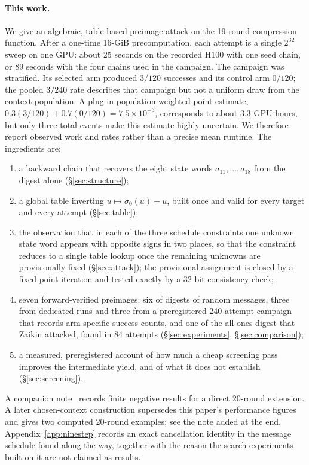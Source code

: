 \documentclass[11pt,a4paper]{article}
\begin{document}
\paragraph{This work.}
We give an algebraic, table-based preimage attack on the 19-round
compression function.  After a one-time 16-GiB precomputation, each attempt
is a single $2^{32}$ sweep on one GPU: about 25 seconds on the recorded H100
with one seed chain, or 89 seconds with the four chains used in the campaign.
The campaign was stratified.  Its selected arm produced $3/120$ successes and
its control arm $0/120$; the pooled $3/240$ rate describes that campaign but
not a uniform draw from the context population.  A plug-in
population-weighted point estimate,
$0.3(3/120)+0.7(0/120)=7.5\times10^{-3}$, corresponds to about 3.3 GPU-hours,
but only three total events make this estimate highly uncertain.  We therefore
report observed work and rates rather than a precise mean runtime.  The
ingredients are:
\begin{enumerate}
  \item a backward chain that recovers the eight state words
    $a_{11},\ldots,a_{18}$ from the digest alone (\S\ref{sec:structure});
  \item a global table inverting $u\mapsto\sigma_0(u)-u$, built once and
    valid for every target and every attempt (\S\ref{sec:table});
  \item the observation that in each of the three schedule constraints one
    unknown state word appears with opposite signs in two places, so that
    the constraint reduces to a single table lookup once the remaining
    unknowns are provisionally fixed (\S\ref{sec:attack}); the provisional
    assignment is closed by a fixed-point iteration and tested exactly by a
    32-bit consistency check;
  \item seven forward-verified preimages: six of digests of random
    messages, three from dedicated runs and three from a preregistered
    240-attempt campaign that records arm-specific success counts, and
    one of the all-ones digest that Zaikin attacked, found in 84 attempts
    (\S\ref{sec:experiments}, \S\ref{sec:comparison});
  \item a measured, preregistered account of how much a cheap screening
    pass improves the intermediate yield, and of what it does not establish
    (\S\ref{sec:screening}).
\end{enumerate}
A companion note~\cite{Basra2026R20} records finite negative results for a
direct 20-round extension.  A later chosen-context construction
\cite{Basra2026Submask} supersedes this paper's performance figures and gives
two computed 20-round examples; see the note added at the end.  Appendix~\ref{app:ninestep} records an exact
cancellation identity in the message schedule found along the way,
together with the reason the search experiments built on it are not
claimed as results.
\end{document}
